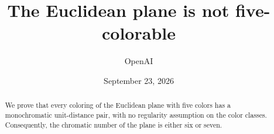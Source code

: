 \documentclass[11pt]{article}
\title{The Euclidean plane is not five-colorable}
\author{OpenAI}
\date{September 23, 2026}
\begin{document}
\maketitle
\begin{abstract}
We prove that every coloring of the Euclidean plane with five colors has a
monochromatic unit-distance pair, with no regularity assumption on the color
classes. Consequently, the chromatic number of the plane is either six or seven.
\end{abstract}








\begingroup
\raggedright
\setlength{\bibsep}{5pt}


\endgroup
\end{document}
